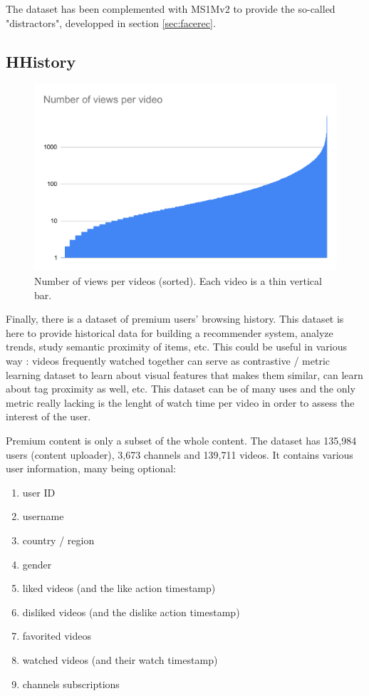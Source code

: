 The dataset has been complemented with MS1Mv2 \citep{celeb1m} to provide the so-called "distractors", developped in section \ref{sec:facerec}.

\subsection{HHistory}

\begin{figure}
    \centering
    \includegraphics[width=\columnwidth]{20-files/video_views.pdf}
    \caption{Number of views per videos (sorted). Each video is a thin vertical bar.}
    \label{fig:my_label}
\end{figure}

Finally, there is a dataset of premium users' browsing history. This dataset is here to provide historical data for building a recommender system, analyze trends, study semantic proximity of items, etc. This could be useful in various way : videos frequently watched together can serve as contrastive / metric learning dataset to learn about visual features that makes them similar, can learn about tag proximity as well, etc. This dataset can be of many uses and the only metric really lacking is the lenght of watch time per video in order to assess the interest of the user.

Premium content is only a subset of the whole content. The dataset has 135,984 users (content uploader), 3,673 channels and 139,711 videos. It contains various user information, many being optional:

\begin{enumerate}
    \item user ID
    \item username
    \item country / region
    \item gender
    \item liked videos (and the like action timestamp)
    \item disliked videos (and the dislike action timestamp)
    \item favorited videos
    \item watched videos (and their watch timestamp)
    \item channels subscriptions
\end{enumerate}

